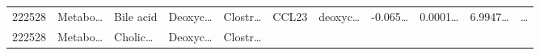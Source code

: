 \documentclass[
]{article}
\begin{document}
\begin{longtable}[]{@{}lllllllllll@{}}
\begin{minipage}[t]{0.05\columnwidth}
222528\strut
\end{minipage} & \begin{minipage}[t]{0.07\columnwidth}\raggedright
Metabo\ldots{}\strut
\end{minipage} & \begin{minipage}[t]{0.07\columnwidth}\raggedright
Bile acid\strut
\end{minipage} & \begin{minipage}[t]{0.09\columnwidth}\raggedright
Deoxyc\ldots{}\strut
\end{minipage} & \begin{minipage}[t]{0.07\columnwidth}\raggedright
Clostr\ldots{}\strut
\end{minipage} & \begin{minipage}[t]{0.07\columnwidth}\raggedright
CCL23\strut
\end{minipage} & \begin{minipage}[t]{0.09\columnwidth}\raggedright
deoxyc\ldots{}\strut
\end{minipage} & \begin{minipage}[t]{0.07\columnwidth}\raggedright
-0.065\ldots{}\strut
\end{minipage} & \begin{minipage}[t]{0.07\columnwidth}\raggedright
0.0001\ldots{}\strut
\end{minipage} & \begin{minipage}[t]{0.07\columnwidth}\raggedright
6.9947\ldots{}\strut
\end{minipage} & \begin{minipage}[t]{0.03\columnwidth}\raggedright
\ldots{}\strut
\end{minipage}\tabularnewline
\begin{minipage}[t]{0.05\columnwidth}\raggedright
222528\strut
\end{minipage} & \begin{minipage}[t]{0.07\columnwidth}\raggedright
Metabo\ldots{}\strut
\end{minipage} & \begin{minipage}[t]{0.07\columnwidth}\raggedright
Cholic\ldots{}\strut
\end{minipage} & \begin{minipage}[t]{0.09\columnwidth}\raggedright
Deoxyc\ldots{}\strut
\end{minipage} & \begin{minipage}[t]{0.07\columnwidth}\raggedright
Clostr\ldots{}\strut
\end{minipage} & \begin{minipage}[t]{0.07\columnwidth}\raggedright

\end{minipage}
\end{longtable}
\end{document}
